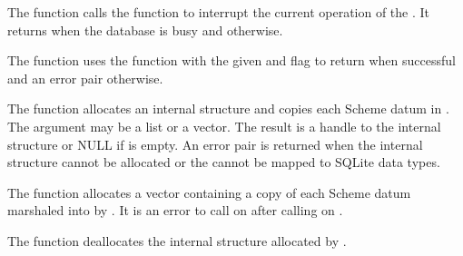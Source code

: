 The  function calls the
 function to interrupt the current operation
of the . It returns  when the database is busy
and  otherwise.

\begin{function}
\end{function}

The  function uses the
 function with the given  and
 flag to return 
when successful and an error pair otherwise.

\begin{function}
\end{function}

The  function allocates an internal
structure and copies each Scheme datum in . The
 argument may be a list or a vector. The result is a
handle to the internal structure or NULL if  is empty.
An error pair is returned when the internal structure cannot be allocated or the
 cannot be mapped to SQLite data types.

\begin{function}
\end{function}

The  function allocates a vector
containing a copy of each Scheme datum marshaled into 
by .
It is an error to call  on 
after calling  on .

\begin{function}
\end{function}

The  function deallocates the internal
structure allocated by .

\begin{function}
\end{function}

